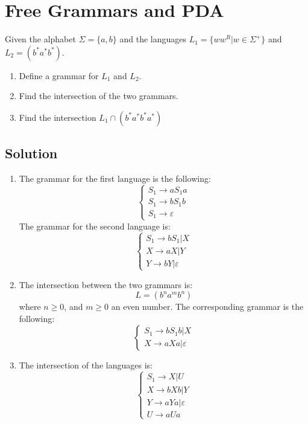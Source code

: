 \documentclass[12pt, a4paper]{report}
\begin{document}
    \section{Free Grammars and PDA}
        Given the alphabet $\Sigma=\{a,b\}$ and the languages $L_1=\{ww^R|w \in \Sigma^{+}\}$ and $L_2=(b^{*}a^{*}b^{*})$.
        \begin{enumerate}
            \item Define a grammar for $L_1$ and $L_2$. 
            \item Find the intersection of the two grammars. 
            \item Find the intersection $L_1 \cap (b^{*}a^{*}b^{*}a^{*})$
        \end{enumerate}
    \subsection*{Solution}
    \begin{enumerate}
        \item The grammar for the first language is the following: 
            \[\begin{cases}
                S_1 \rightarrow aS_1a           \\
                S_1 \rightarrow bS_1b           \\
                S_1 \rightarrow \varepsilon
            \end{cases}\]
            The grammar for the second language is: 
            \[\begin{cases}
                S_1 \rightarrow bS_1|X          \\
                X \rightarrow aX|Y              \\
                Y \rightarrow bY|\varepsilon
            \end{cases}\]
        \item The intersection between the two grammars is: 
            \[L=(b^na^mb^n)\]
            where $n \geq 0$, and $m \geq 0$ an even number. The corresponding grammar is the following: 
            \[\begin{cases}
                S_1 \rightarrow bS_1b | X \\
                X \rightarrow aXa | \varepsilon
            \end{cases}\]
        \item The intersection of the languages is: 
            \[\begin{cases}
                S_1 \rightarrow X | U               \\
                X \rightarrow bXb | Y               \\
                Y \rightarrow aYa | \varepsilon     \\
                U \rightarrow aUa   
            \end{cases}\]
    \end{enumerate}
\end{document}
